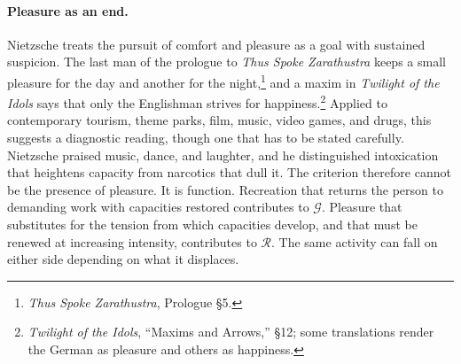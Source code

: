 \documentclass[11pt]{article}
\theoremstyle{definition}
\begin{document}
\paragraph{Pleasure as an end.} Nietzsche treats the pursuit of comfort and pleasure as a goal with sustained suspicion. The last man of the prologue to \emph{Thus Spoke Zarathustra} keeps a small pleasure for the day and another for the night,\footnote{\emph{Thus Spoke Zarathustra}, Prologue \S5.} and a maxim in \emph{Twilight of the Idols} says that only the Englishman strives for happiness.\footnote{\emph{Twilight of the Idols}, ``Maxims and Arrows,'' \S12; some translations render the German as pleasure and others as happiness.} Applied to contemporary tourism, theme parks, film, music, video games, and drugs, this suggests a diagnostic reading, though one that has to be stated carefully. Nietzsche praised music, dance, and laughter, and he distinguished intoxication that heightens capacity from narcotics that dull it. The criterion therefore cannot be the presence of pleasure. It is function. Recreation that returns the person to demanding work with capacities restored contributes to $\mathcal{G}$. Pleasure that substitutes for the tension from which capacities develop, and that must be renewed at increasing intensity, contributes to $\mathcal{R}$. The same activity can fall on either side depending on what it displaces.
\end{document}
